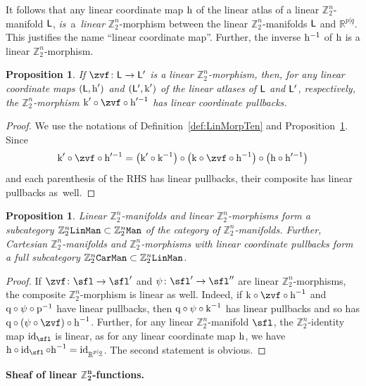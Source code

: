\documentclass[pdftex]{sigma}%
\newcommand{\rmh}{\textnormal{h}}
\newcommand{\rmk}{\textnormal{k}}
\newcommand{\rmp}{\textnormal{p}}
\newcommand{\rmq}{\textnormal{q}}
\newcommand{\op}[1]{\operatorname{#1}}
\newcommand{\catname}[1]{\textnormal{\texttt{#1}}}
\newcommand{\R}{{\mathbb R}}
\newcommand{\Z}{{\mathbb Z}}
\def\ul{\underline}
\def\ul{\underline}
\newcommand{\0}{\otimes}
\newcommand{\id}{\op{id}}
\newcommand{\z}{\Z_2^n}
\numberwithin{equation}{section}
\newtheorem{Proposition}[Theorem]{Proposition}
 { \theoremstyle{definition}
\newtheorem{Definition}[Theorem]{Definition}
\newtheorem{Example}[Theorem]{Example}
\newtheorem{Remark}[Theorem]{Remark} }
\begin{document}
It follows that any linear coordinate map $\rm h$ of the linear atlas of a linear $\z$-manifold $\sf L$, {\it is}~a~{\it linear} $\z$-morphism between the linear $\z$-manifolds $\sf L$ and $\R^{p|\ul q}$. This justifies the name ``linear coordinate map''. Further, the inverse ${\rm h}^{-1}$ of $\rm h$ is a linear $\z$-morphism.

\begin{Proposition}\label{prop:IndCoordMap}
If $\zvf\colon \sf L\to \sf L'$ is a linear $\z$-morphism, then, for any linear coordinate maps $(\sf L,\rmh')$ and $(\sf L',\rmk')$ of the linear atlases of $\sf L$ and $\sf L'$, respectively, the $\z$-morphism $\rmk'\circ\zvf\circ\rmh'^{-1}$ has linear coordinate pullbacks.
\end{Proposition}
\begin{proof}
We use the notations of Definition~\ref{def:LinMorpTen} and Proposition~\ref{prop:IndCoordMap}. Since
\[
\rmk'\circ\zvf\circ\rmh'^{-1}=\big(\rmk'\circ\rmk^{-1}\big)\circ \big(\rmk\circ \zvf\circ \rmh^{-1}\big)\circ\big(\rmh\circ\rmh'^{-1}\big)
\]
and each parenthesis of the {\small RHS} has linear pullbacks, their composite has linear pullbacks as~well.
\end{proof}

{\sloppy\begin{Proposition} Linear $\Z_2^n$-manifolds and linear $\z$-morphisms form a subcategory $\Z_2^n\catname{LinMan}\subset\z\tt Man$ of the category of $\z$-manifolds. Further, Cartesian $\z$-manifolds and $\z$-morphisms with linear coordinate pullbacks form a full subcategory $\z{\tt CarMan}\subset\z{\tt LinMan}$.
\end{Proposition}

}

\begin{proof}
If $\zvf\colon \sfl\to \sfl'$ and $\psi\colon \sfl'\to \sfl''$ are linear $\z$-morphisms, the composite $\z$-morphism is linear as well. Indeed, if $\rmk\circ\zvf\circ\rmh^{-1}$ and $\rmq\circ\psi\circ\rmp^{-1}$ have linear pullbacks, then $\rmq\circ\psi\circ\rmk^{-1}$ has linear pullbacks and so has $\rmq\circ(\psi\circ \zvf)\circ\rmh^{-1}$. Further, for any linear $\z$-manifold $\sfl$, the $\z$-identity map $\id_\sfl$ is linear, as for any linear coordinate map $\rmh$, we have $\rmh\circ\id_\sfl\circ\rmh^{-1}=\id_{\R^{p|\ul q}}$. The second statement is obvious.\end{proof}

\medskip\noindent
{\bf Sheaf of linear $\boldsymbol{\z}$-functions.}
\end{document}
